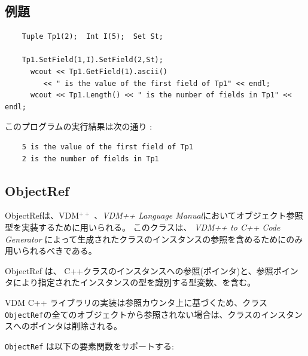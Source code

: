 \documentclass[\pformat,12pt]{jarticle}
\begin{document}
\subsection*{例題}

\begin{verbatim}
    Tuple Tp1(2);  Int I(5);  Set St;

    Tp1.SetField(1,I).SetField(2,St);
      wcout << Tp1.GetField(1).ascii() 
         << " is the value of the first field of Tp1" << endl;
      wcout << Tp1.Length() << " is the number of fields in Tp1" << endl;
\end{verbatim}


\noindent このプログラムの実行結果は次の通り :

\begin{verbatim}
    5 is the value of the first field of Tp1
    2 is the number of fields in Tp1
\end{verbatim}

\subsection{ObjectRef}

ObjectRefは、VDM$^{++}$ \cite{AFROCGEDLRM}、{\it VDM++ Language Manual}\cite{LangManPP-CSK}においてオブジェクト参照型を実装するために用いられる。
このクラスは、 {\it VDM++ to C++ Code Generator} \cite{CGManPP-CSK}によって生成されたクラスのインスタンスの参照を含めるためにのみ用いられるべきである。

ObjectRef は、 C++クラスのインスタンスへの参照(ポインタ)と、参照ポインタにより指定されたインスタンスの型を識別する型変数、を含む。

VDM C++ ライブラリの実装は参照カウンタ上に基づくため、クラス \texttt{ObjectRef}の全てのオブジェクトから参照されない場合は、クラスのインスタンスへのポインタは削除される。




{\tt ObjectRef} は以下の要素関数をサポートする:
\end{document}
